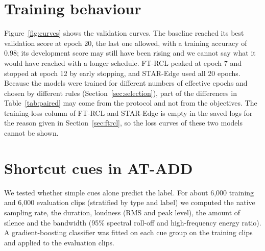 
\section{Training behaviour}
\label{sec:training}

Figure~\ref{fig:curves} shows the validation curves. The baseline reached its best validation score at epoch 20, the last one allowed, with a training accuracy of 0.98; its development score may still have been rising and we cannot say what it would have reached with a longer schedule. FT-RCL peaked at epoch 7 and stopped at epoch 12 by early stopping, and STAR-Edge used all 20 epochs. Because the models were trained for different numbers of effective epochs and chosen by different rules (Section~\ref{sec:selection}), part of the differences in Table~\ref{tab:paired} may come from the protocol and not from the objectives. The training-loss column of FT-RCL and STAR-Edge is empty in the saved logs for the reason given in Section~\ref{sec:ftrcl}, so the loss curves of these two models cannot be shown.


\section{Shortcut cues in AT-ADD}
\label{sec:shortcuts}

We tested whether simple cues alone predict the label. For about 6{,}000 training and 6{,}000 evaluation clips (stratified by type and label) we computed the native sampling rate, the duration, loudness (RMS and peak level), the amount of silence and the bandwidth (95\% spectral roll-off and high-frequency energy ratio). A gradient-boosting classifier was fitted on each cue group on the training clips and applied to the evaluation clips.


